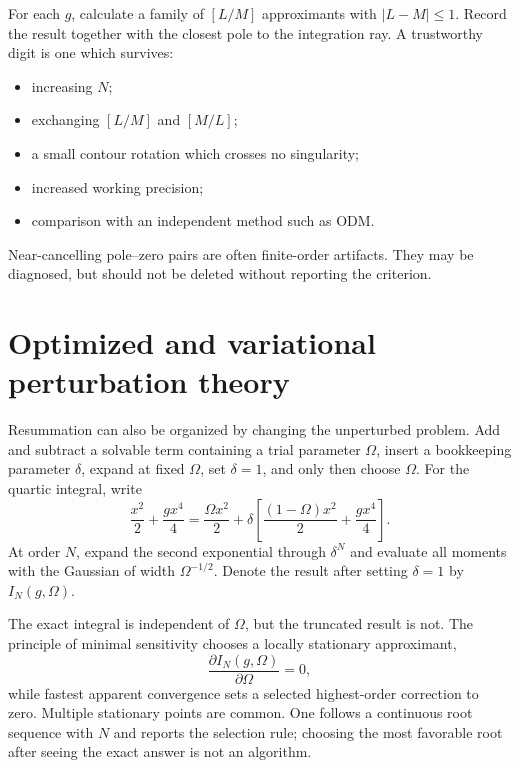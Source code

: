 For each $g$, calculate a family of $[L/M]$ approximants with
$|L-M|\leq1$.  Record the result together with the closest pole to the
integration ray.  A trustworthy digit is one which survives:
\begin{itemize}
  \item increasing $N$;
  \item exchanging $[L/M]$ and $[M/L]$;
  \item a small contour rotation which crosses no singularity;
  \item increased working precision;
  \item comparison with an independent method such as ODM.
\end{itemize}
Near-cancelling pole--zero pairs are often finite-order artifacts.  They may
be diagnosed, but should not be deleted without reporting the criterion.

\section{Optimized and variational perturbation theory}
\label{sec:opt-vpt}

Resummation can also be organized by changing the unperturbed problem.  Add
and subtract a solvable term containing a trial parameter $\Omega$, insert a
bookkeeping parameter $\delta$, expand at fixed $\Omega$, set $\delta=1$,
and only then choose $\Omega$.  For the quartic integral, write
\begin{equation}
  \frac{x^2}{2}+\frac{gx^4}{4}
  =\frac{\Omega x^2}{2}
  +\delta\left[
    \frac{(1-\Omega)x^2}{2}+\frac{gx^4}{4}
  \right].
  \label{eq:delta-splitting}
\end{equation}
At order $N$, expand the second exponential through $\delta^N$ and evaluate
all moments with the Gaussian of width $\Omega^{-1/2}$.  Denote the result
after setting $\delta=1$ by $I_N(g,\Omega)$.

The exact integral is independent of $\Omega$, but the truncated result is
not.  The principle of minimal sensitivity chooses a locally stationary
approximant,
\begin{equation}
  \frac{\partial I_N(g,\Omega)}{\partial\Omega}=0,
  \label{eq:pms-condition}
\end{equation}
while fastest apparent convergence sets a selected highest-order correction
to zero.  Multiple stationary points are common.  One follows a continuous
root sequence with $N$ and reports the selection rule; choosing the most
favorable root after seeing the exact answer is not an algorithm.

